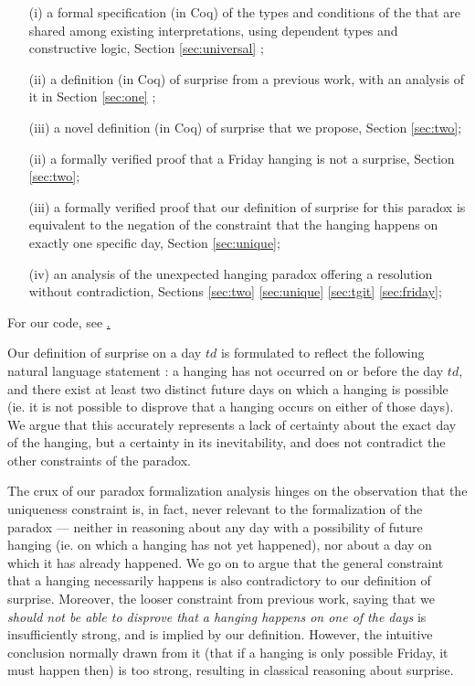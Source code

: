 \documentclass[journal]{journal}
\begin{document}
\begin{itemize}
  \item[(i)] a formal specification (in Coq) of the types and conditions of the that
  are shared among existing interpretations, using dependent types and constructive logic,
  Section \ref{sec:universal} ;
  \item[(ii)] a definition (in Coq) of surprise from a previous work, with an analysis of it
  in Section \ref{sec:one} ;
  \item[(iii)] a novel definition (in Coq) of surprise that we propose,
  Section \ref{sec:two};
  \item[(ii)] a formally verified proof that a Friday hanging is not a surprise, Section \ref{sec:two};
  \item[(iii)] a formally verified proof that our definition of
  surprise for this paradox is equivalent to the negation of the
  constraint that the hanging happens on exactly one specific day, Section \ref{sec:unique};
  \item[(iv)] an analysis of the unexpected hanging paradox offering a resolution without
  contradiction, Sections \ref{sec:two} \ref{sec:unique} \ref{sec:tgit} \ref{sec:friday};
\end{itemize}

For our code, see \href{https://github.com/polinavino/unexpected_hanging/blob/master/unexpected_hanging.v}.

Our definition of surprise on a day $td$ is formulated to reflect
the following natural language statement : a hanging has not occurred on or before the day $td$,
and there exist at least two distinct future days on which a hanging
is possible (ie. it is not possible to disprove that a hanging occurs on either
of those days).
We argue that this accurately represents a lack of certainty about the exact day of
the hanging, but a certainty in its inevitability, and does not contradict
the other constraints of the paradox.

The crux of our paradox formalization analysis hinges on the observation that the uniqueness constraint
  is, in fact, never relevant to the formalization of the paradox --- neither in reasoning about
  any day with a possibility of future hanging (ie. on which
  a hanging has not yet happened), nor about a day on which it has already happened.
  We go on to argue that the general constraint that a hanging necessarily happens is
   also contradictory to our definition of surprise. Moreover, the looser constraint
  from previous work,
  saying that we \emph{should not be able to disprove that a hanging happens on one of the
  days} is insufficiently strong, and is implied by our definition.
  However, the intuitive conclusion normally drawn from it
  (that if a hanging is only possible Friday, it must happen then)
  is too strong, resulting in classical reasoning about surprise.
\end{document}
